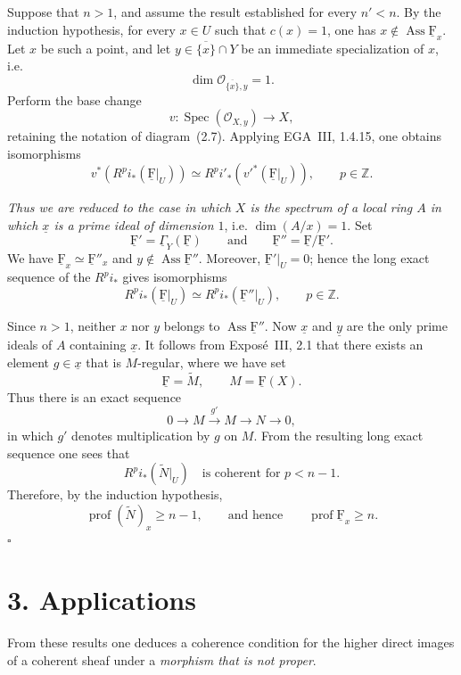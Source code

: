 \documentclass[10pt,a4paper]{article}
\newcommand{\uF}{\underline{\mathrm F}}
\newcommand{\cF}{\uF}
\newcommand{\cO}{\mathcal O}
\newcommand{\SheafGamma}{\underline{\Gamma}}
\newcommand{\Ass}{\operatorname{Ass}}
\newcommand{\Spec}{\operatorname{Spec}}
\newcommand{\prof}{\operatorname{prof}}
\theoremstyle{sgatheorem}
\theoremstyle{plain}
\numberwithin{equation}{section}
\begin{document}

\medskip
\noindent Suppose that $n>1$, and assume the result established for every
$n'<n$. By the induction hypothesis, for every $x\in U$ such that $c(x)=1$,
one has $x\notin\Ass\cF_x$. Let $x$ be such a point, and let
$y\in\overline{\{x\}}\cap Y$ be an immediate specialization of $x$, i.e.
\[
  \dim\cO_{\overline{\{x\}},y}=1.
\]
Perform the base change
\[
  v\colon\Spec(\cO_{X,y})\longrightarrow X,
\]
retaining the notation of diagram~\textup{(2.7)}. Applying EGA~III, 1.4.15,
one obtains isomorphisms
\[
  v^*(R^p i_*(\cF|_U))
  \simeq
  R^p i'_*(v'^*(\cF|_U)),
  \qquad p\in\mathbb Z.
\]

\noindent\emph{Thus we are reduced to the case in which $X$ is the spectrum
of a local ring $A$ in which $\underline{x}$ is a prime ideal of dimension
$1$}, i.e. $\dim(A/x)=1$. Set
\[
  \cF'=\SheafGamma_Y(\cF)
  \qquad\text{and}\qquad
  \cF''=\cF/\cF'.
\]
We have $\cF_x\simeq\cF''_x$ and $y\notin\Ass\cF''$. Moreover,
$\cF'|_U=0$; hence the long exact sequence of the $R^p i_*$ gives
isomorphisms
\[
  R^p i_*(\cF|_U)
  \simeq
  R^p i_*(\cF''|_U),
  \qquad p\in\mathbb Z.
\]

\quad Since $n>1$,
neither $x$ nor $y$ belongs to $\Ass\cF''$. Now $\underline{x}$ and
$\underline{y}$ are the only prime ideals of $A$ containing $\underline{x}$.
It follows from Expos\'e~III, 2.1 that there exists an element
$g\in\underline{x}$ that is $M$-regular, where we have set
\[
  \cF=\widetilde M,
  \qquad M=\cF(X).
\]
Thus there is an exact sequence
\[
  0\longrightarrow M\xrightarrow{g'}M\longrightarrow N\longrightarrow0,
\]
in which $g'$ denotes multiplication by $g$ on $M$. From the resulting long
exact sequence one sees that
\[
  R^p i_*(\widetilde N|_U)
  \quad\text{is coherent for }p<n-1.
\]
Therefore, by the induction hypothesis,
\[
  \prof(\widetilde N)_x\geq n-1,
  \qquad\text{and hence}\qquad
  \prof\cF_x\geq n.
\]
\hfill$\square$


\section*{3. Applications}

\noindent From these results one deduces a coherence condition for the higher
direct images of a coherent sheaf under a \emph{morphism that is not proper}.
\end{document}
